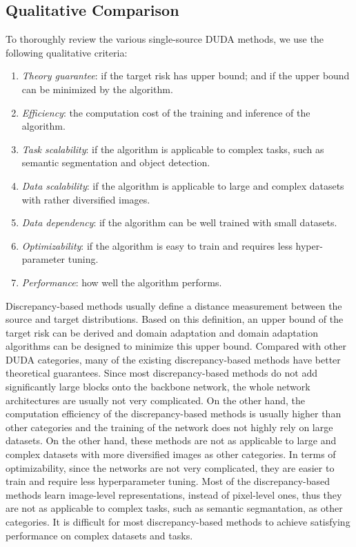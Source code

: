 \documentclass[conference]{IEEEtran}
\begin{document}
\subsection{Qualitative Comparison}
To thoroughly review the various single-source DUDA methods, we use the following
qualitative criteria: 
\begin{enumerate}
    \item \textit{Theory guarantee}: if the target risk has upper bound;
    and if the upper bound can be minimized by the algorithm.
    \item \textit{Efficiency}: the computation cost of the training and inference
    of the algorithm.
    \item \textit{Task scalability}: if the algorithm is applicable to complex
    tasks, such as semantic segmentation and object detection.
    \item \textit{Data scalability}: if the algorithm is applicable to large 
    and complex datasets with rather diversified images.
    \item \textit{Data dependency}: if the algorithm can be well trained with small 
    datasets.
    \item \textit{Optimizability}: if the algorithm is easy to train and requires less hyper-parameter 
    tuning.
    \item \textit{Performance}: how well the algorithm performs.
\end{enumerate}

Discrepancy-based methods usually define a distance measurement between the source 
and target distributions. 
Based on this definition, an upper bound of the target risk can be derived and domain adaptation
and domain adaptation algorithms can be designed to minimize this upper bound.
Compared with other DUDA categories, many of the existing discrepancy-based methods have 
better theoretical guarantees. 
Since most discrepancy-based methods do not add significantly large blocks onto the backbone network,
the whole network architectures are usually not very complicated.
On the other hand, the computation efficiency of the discrepancy-based methods is 
usually higher than other categories and the training of the network does not highly rely
on large datasets.
On the other hand, these methods are not as applicable to large and complex datasets
with more diversified images as other categories.
In terms of optimizability, since the networks are not very complicated, they are 
easier to train and require less hyperparameter tuning. 
Most of the discrepancy-based methods learn image-level representations, instead of 
pixel-level ones, thus they are not as applicable to complex tasks, such as semantic segmantation,
as other categories.
It is difficult for most discrepancy-based methods to achieve satisfying performance on complex datasets and tasks.
\end{document}
